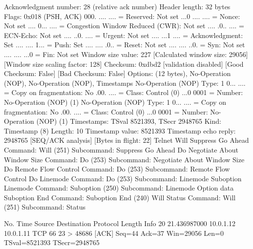     Acknowledgment number: 28    (relative ack number)
    Header length: 32 bytes
    Flags: 0x018 (PSH, ACK)
        000. .... .... = Reserved: Not set
        ...0 .... .... = Nonce: Not set
        .... 0... .... = Congestion Window Reduced (CWR): Not set
        .... .0.. .... = ECN-Echo: Not set
        .... ..0. .... = Urgent: Not set
        .... ...1 .... = Acknowledgment: Set
        .... .... 1... = Push: Set
        .... .... .0.. = Reset: Not set
        .... .... ..0. = Syn: Not set
        .... .... ...0 = Fin: Not set
    Window size value: 227
    [Calculated window size: 29056]
    [Window size scaling factor: 128]
    Checksum: 0xdbd2 [validation disabled]
        [Good Checksum: False]
        [Bad Checksum: False]
    Options: (12 bytes), No-Operation (NOP), No-Operation (NOP), Timestamps
        No-Operation (NOP)
            Type: 1
                0... .... = Copy on fragmentation: No
                .00. .... = Class: Control (0)
                ...0 0001 = Number: No-Operation (NOP) (1)
        No-Operation (NOP)
            Type: 1
                0... .... = Copy on fragmentation: No
                .00. .... = Class: Control (0)
                ...0 0001 = Number: No-Operation (NOP) (1)
        Timestamps: TSval 8521393, TSecr 2948765
            Kind: Timestamp (8)
            Length: 10
            Timestamp value: 8521393
            Timestamp echo reply: 2948765
    [SEQ/ACK analysis]
        [Bytes in flight: 22]
Telnet
    Will Suppress Go Ahead
        Command: Will (251)
        Subcommand: Suppress Go Ahead
    Do Negotiate About Window Size
        Command: Do (253)
        Subcommand: Negotiate About Window Size
    Do Remote Flow Control
        Command: Do (253)
        Subcommand: Remote Flow Control
    Do Linemode
        Command: Do (253)
        Subcommand: Linemode
    Suboption Linemode
        Command: Suboption (250)
        Subcommand: Linemode
            Option data
    Suboption End
        Command: Suboption End (240)
    Will Status
        Command: Will (251)
        Subcommand: Status

No.     Time           Source                Destination           Protocol Length Info
     20 21.436987000   10.0.1.12             10.0.1.11             TCP      66     23 > 48686 [ACK] Seq=44 Ack=37 Win=29056 Len=0 TSval=8521393 TSecr=2948765

